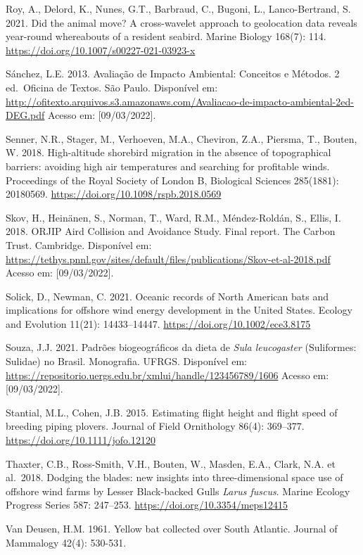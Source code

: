 \documentclass[
  oneside]{scrbook}
\begin{document}
Roy, A., Delord, K., Nunes, G.T., Barbraud, C., Bugoni, L., Lanco-Bertrand, S. 2021. Did the animal move? A cross-wavelet approach to geolocation data reveals year-round whereabouts of a resident seabird. Marine Biology 168(7): 114. \url{https://doi.org/10.1007/s00227-021-03923-x}

Sánchez, L.E. 2013. Avaliação de Impacto Ambiental: Conceitos e Métodos. 2 ed.~Oficina de Textos. São Paulo. Disponível em: \url{http://ofitexto.arquivos.s3.amazonaws.com/Avaliacao-de-impacto-ambiental-2ed-DEG.pdf} Acesso em: {[}09/03/2022{]}.

Senner, N.R., Stager, M., Verhoeven, M.A., Cheviron, Z.A., Piersma, T., Bouten, W. 2018. High-altitude shorebird migration in the absence of topographical barriers: avoiding high air temperatures and searching for profitable winds. Proceedings of the Royal Society of London B, Biological Sciences 285(1881): 20180569. \url{https://doi.org/10.1098/rspb.2018.0569}

Skov, H., Heinänen, S., Norman, T., Ward, R.M., Méndez-Roldán, S., Ellis, I. 2018. ORJIP Aird Collision and Avoidance Study. Final report. The Carbon Trust. Cambridge. Disponível em: \url{https://tethys.pnnl.gov/sites/default/files/publications/Skov-et-al-2018.pdf} Acesso em: {[}09/03/2022{]}.

Solick, D., Newman, C. 2021. Oceanic records of North American bats and implications for offshore wind energy development in the United States. Ecology and Evolution 11(21): 14433--14447. \url{https://doi.org/10.1002/ece3.8175}

Souza, J.J. 2021. Padrões biogeográficos da dieta de \emph{Sula leucogaster} (Suliformes: Sulidae) no Brasil. Monografia. UFRGS. Disponível em: \url{https://repositorio.uergs.edu.br/xmlui/handle/123456789/1606} Acesso em: {[}09/03/2022{]}.

Stantial, M.L., Cohen, J.B. 2015. Estimating flight height and flight speed of breeding piping plovers. Journal of Field Ornithology 86(4): 369--377. \url{https://doi.org/10.1111/jofo.12120}

Thaxter, C.B., Ross-Smith, V.H., Bouten, W., Masden, E.A., Clark, N.A. et al.~2018. Dodging the blades: new insights into three-dimensional space use of offshore wind farms by Lesser Black-backed Gulls \emph{Larus fuscus}. Marine Ecology Progress Series 587: 247--253. \url{https://doi.org/10.3354/meps12415}

Van Deusen, H.M. 1961. Yellow bat collected over South Atlantic. Journal of Mammalogy 42(4): 530-531.
\end{document}
